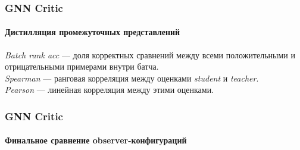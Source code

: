 \documentclass[aspectratio=169]{beamer}
\begin{document}
\begin{frame}
\frametitle{GNN Critic}
\framesubtitle{Дистилляция промежуточных представлений}
\begin{table}[htbp]
\caption{Влияние дистилляции промежуточных представлений \textit{teacher}-модели}
\label{tab:student-intermediate-ablation}
\centering
\scriptsize
{}
\end{table}
{\fontsize{6.9}{7.8}\selectfont
\textit{Batch rank acc} --- доля корректных сравнений между всеми положительными и отрицательными примерами внутри батча.\\[0.03cm]
\textit{Spearman} --- ранговая корреляция между оценками \textit{student} и \textit{teacher}.\\[0.03cm]
\textit{Pearson} --- линейная корреляция между этими оценками.\\[0.03cm]
}
\end{frame}

\begin{frame}
\frametitle{GNN Critic}
\framesubtitle{Финальное сравнение observer-конфигураций}
\begin{table}[htbp]
\caption{Финальное сравнение \textit{observer}-конфигураций}
\label{tab:observer-final-comparison}
\centering
\scriptsize
{}
\end{table}
\end{frame}
\end{document}
